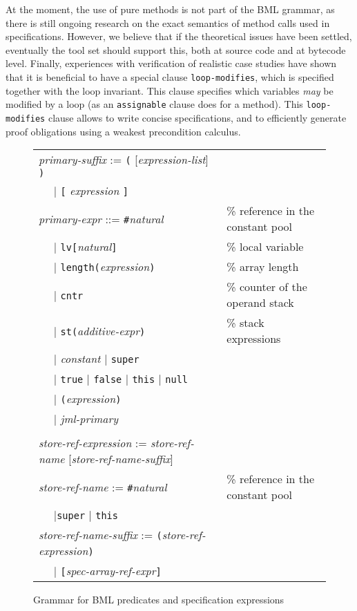 At the moment, the use of pure methods is not part of the BML grammar,
as there is still ongoing research on the exact semantics of method
calls used in specifications. However, we believe that if the
theoretical issues have been settled, eventually the
\mobius tool set should support this, both at source code and at 
bytecode level. Finally, experiences with verification of realistic case
studies have shown that it is beneficial to have a special clause
\texttt{loop-modifies}, which is specified together with the loop
invariant. This clause specifies which variables
\emph{may} be modified by a loop (as an \texttt{assignable} clause does
for a method). This \texttt{loop-modifies} clause allows to write
concise specifications, and to efficiently generate proof obligations
using a weakest precondition calculus.

\begin{figure}[t]

\begin{tabular}{lll}
\multicolumn{2}{l}{\emph{primary-suffix} := \texttt{(} [\emph{expression-list}] \texttt{)}}\\
\hspace*{1cm}& \(\mid\) \texttt{[} \emph{expression} \texttt{]}\\
\multicolumn{2}{l}{\emph{primary-expr} ::= 
\texttt{\#}\emph{natural}} & \% reference in the constant pool \\
&\(\mid\) \texttt{lv[}\emph{natural}\texttt{]} &\% local variable \\
&\(\mid\) \texttt{length(}\emph{expression}\texttt{)} &\% array
length \\
&\(\mid\) \texttt{cntr} &\% counter of the operand stack\\
&\(\mid\) \texttt{st(}\emph{additive-expr}\texttt{)} &\% stack
expressions\\
&\(\mid\) \emph{constant} \(\mid\)
\texttt{super}\\
&\(\mid\) \texttt{true} \(\mid\) \texttt{false} \(\mid\)
\texttt{this} \(\mid\) \texttt{null} \\
&\(\mid\) \texttt{(}\emph{expression}\texttt{)}\\
&\(\mid\) \emph{jml-primary}\\
\\
\multicolumn{2}{l}{\emph{store-ref-expression} := \emph{store-ref-name}
[\emph{store-ref-name-suffix}]}\\
\multicolumn{2}{l}{\emph{store-ref-name} := 
\texttt{\#}\emph{natural}} &\% reference in the constant pool \\
&\(\mid\)\texttt{super} \(\mid\) \texttt{this}\\
\multicolumn{2}{l}{\emph{store-ref-name-suffix} := 
\texttt{(}\emph{store-ref-expression}\texttt{)}}\\
&\(\mid\) \texttt{[}\emph{spec-array-ref-expr}\texttt{]}
\end{tabular}

\caption{Grammar for BML predicates and specification expressions}
\label{FigBMLGrammar}
\end{figure}

